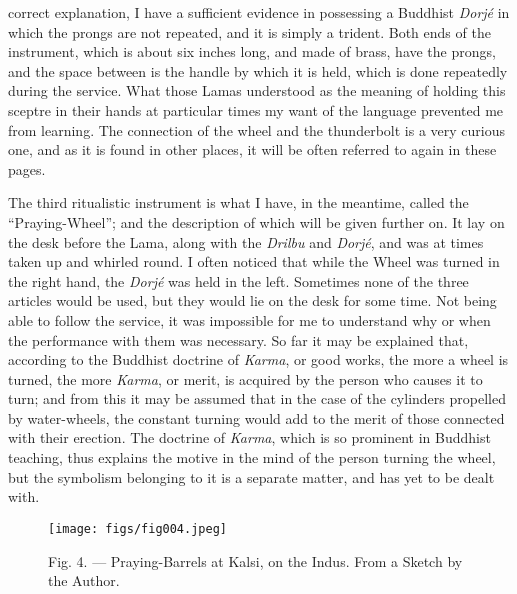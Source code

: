 \documentclass[a4paper, 11pt, oneside, polutonikogreek, english]{article}
\begin{document}
correct explanation, I have a sufficient evidence in possessing a Buddhist \emph{Dorjé} in which the prongs are not repeated, and it is simply a trident. Both ends of the instrument, which is about six inches long, and made of brass, have the prongs, and the space between is the handle by which it is held, which is done repeatedly during the service. What those Lamas understood as the meaning of holding this sceptre in their hands at particular times my want of the language prevented me from learning. The connection of the wheel and the thunderbolt is a very curious one, and as it is found in other places, it will be often referred to again in these pages.

The third ritualistic instrument is what I have, in the meantime, called the ``Praying-Wheel''; and the description of which will be given further on. It lay on the desk before the Lama, along with the \emph{Drilbu} and \emph{Dorjé}, and was at times taken up and whirled round. I often noticed that while the Wheel was turned in the right hand, the \emph{Dorjé} was held in the left. Sometimes none of the three articles would be used, but they would lie on the desk for some time. Not being able to follow the service, it was impossible for me to understand why or when the performance with them was necessary. So far it may be explained that, according to the Buddhist doctrine of \emph{Karma}, or good works, the more a wheel is turned, the more \emph{Karma}, or merit, is acquired by the person who causes it to turn; and from this it may be assumed that in the case of the cylinders propelled by water-wheels, the constant turning would add to the merit of those connected with their erection. The doctrine of \emph{Karma}, which is so prominent in Buddhist teaching, thus explains the motive in the mind of the person turning the wheel, but the symbolism belonging to it is a separate matter, and has yet to be dealt with.

\begin{figure}[H]
\centering
\texttt{[image: figs/fig004.jpeg]}
\caption[Fig. 4. --- Praying-Barrels at Kalsi, on the Indus.]{Fig. 4. --- Praying-Barrels at Kalsi, on the Indus. From a Sketch by the Author.}
\end{figure}
\end{document}
